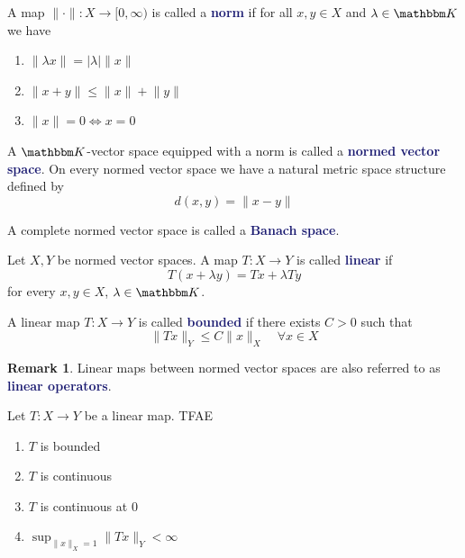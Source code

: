 \documentclass[11pt]{article}
\numberwithin{equation}{section}
\newcommand{\navy}[1]{\textcolor{MidnightBlue}{\bf #1}}
\theoremstyle{definition}
\theoremstyle{definition}
\newtheorem*{remark}{Remark}
\newcommand\norm[1]{\lVert#1\rVert}
\newcommand{\1}{\mathbbm 1}
\newcommand{\KK}{\mathbbm K}
\begin{document}
\begin{definition}[Norm]
	A map $\norm{\cdot}: X \to [0,\infty)$ is called a \navy{norm} if for all $x,y \in X$ and $\lambda \in \KK$ we have
	\begin{enumerate}
		\item $\norm{\lambda x} = |\lambda| \norm{x}$
		\item $\norm{x + y} \leq \norm{x} + \norm{y}$
		\item $\norm{x} = 0 \iff x = 0$
	\end{enumerate}
\end{definition}

\begin{definition}
	A $\KK$-vector space equipped with a norm is called a \navy{normed vector space}. On every normed vector space we have a natural metric space structure defined by
	\begin{equation}
		d(x,y) = \norm{x-y}
	\end{equation}
\end{definition}

\begin{definition}
	A complete normed vector space is called a \navy{Banach space}. 
\end{definition}

\begin{definition}
	Let $X,Y$ be normed vector spaces. A map $T: X \to Y$ is called \navy{linear} if
	\begin{equation}
		T(x + \lambda y) = Tx + \lambda T y
	\end{equation}
	for every $x,y \in X$, $\lambda \in \KK$. 
\end{definition}

\begin{definition}[Bounded]
	A linear map $T: X \to Y$ is called \navy{bounded} if there exists $C > 0$ such that
	\begin{equation}
		\norm{Tx}_Y \leq C \norm{x}_X \quad \forall x \in X
	\end{equation}
\end{definition}

\begin{remark}
	Linear maps between normed vector spaces are also referred to as \navy{linear operators}. 
\end{remark}

\begin{theorem}[]
	Let $T: X \to Y$ be a linear map. TFAE
	\begin{enumerate}
		\item $T$ is bounded
		\item $T$ is continuous
		\item $T$ is continuous at $0$
		\item $\sup_{\norm{x}_X = 1} \norm{Tx}_Y < \infty$
	\end{enumerate}
\end{theorem}
\end{document}
